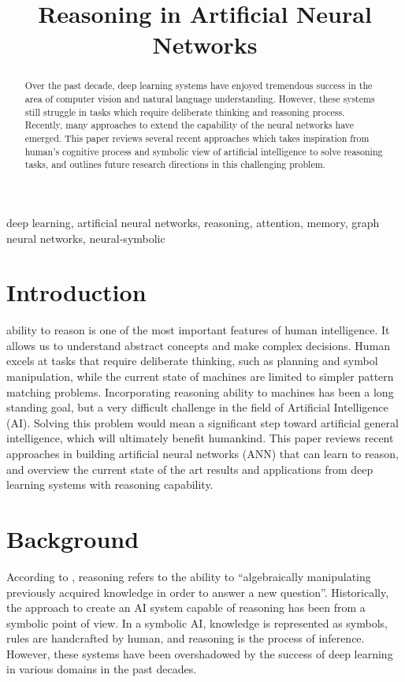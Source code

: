 \documentclass[journal]{IEEEtran}
\begin{document}
\title{Reasoning in Artificial Neural Networks}

\author{
}

\maketitle

\begin{abstract}
Over the past decade, deep learning systems have enjoyed tremendous success in the area of computer vision and natural language understanding.
However, these systems still struggle in tasks which require deliberate thinking and reasoning process. 
Recently, many approaches to extend the capability of the neural networks have emerged. 
This paper reviews several recent approaches which takes inspiration from human's cognitive process and symbolic view of artificial intelligence
to solve reasoning tasks, and outlines future research directions in this challenging problem.
\end{abstract}

\begin{IEEEkeywords}
deep learning, artificial neural networks, reasoning, attention, memory, graph neural networks, neural-symbolic
\end{IEEEkeywords}

\section{Introduction}

 ability to reason is one of the most important features of human intelligence. 
It allows us to understand abstract concepts and make complex decisions.
Human excels at tasks that require deliberate thinking, such as planning and symbol manipulation, 
while the current state of machines are limited to simpler pattern matching problems.
Incorporating reasoning ability to machines has been a long standing goal, but a very difficult challenge in the field of Artificial Intelligence (AI). 
Solving this problem would mean a significant step toward artificial general intelligence, which will ultimately benefit humankind. 
This paper reviews recent approaches in building artificial neural networks (ANN) that can learn to reason, 
and overview the current state of the art results and applications from deep learning systems with reasoning capability.

\section{Background}
According to \cite{bottou2014machine}, reasoning refers to the ability to ``algebraically manipulating previously acquired knowledge in order to answer a new question''.
Historically, the approach to create an AI system capable of reasoning has been from a symbolic point of view.
In a symbolic AI, knowledge is represented as symbols, rules are handcrafted by human, and reasoning is the process of inference.
However, these systems have been overshadowed by the success of deep learning in various domains in the past decades. 
\end{document}
